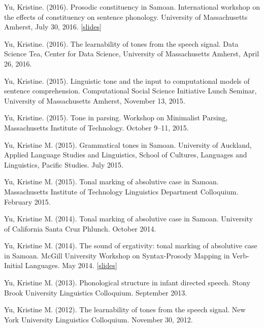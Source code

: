 \documentclass[10pt]{article}
\begin{document}
\begin{bibenum}
  \item Yu, Kristine. (2016). Prosodic constituency in Samoan. International workshop on the effects of
    constituency on sentence phonology. University of Massachusetts
    Amherst, July 30, 2016. [\href{https://speakerdeck.com/krisyu/prosodic-constituency-in-samoan}{slides}]

  \item Yu, Kristine. (2016). The learnability of tones from the
    speech signal. Data Science Tea, Center for Data
    Science, University of Massachusetts Amherst, April 26, 2016.

  \item Yu, Kristine. (2015). Linguistic tone and the input to
    computational models of sentence comprehension. Computational
    Social Science Initiative Lunch Seminar, University of
    Massachusetts Amherst, November 13, 2015.

  \item Yu, Kristine. (2015). Tone in parsing. Workshop on Minimalist
    Parsing, Massachusetts Institute of Technology. October 9--11, 2015.

    \item Yu, Kristine M. (2015). Grammatical tones in
      Samoan. University of Auckland, Applied Language Studies and Linguistics, School of Cultures, Languages and Linguistics, Pacific Studies. July 2015.

    \item Yu, Kristine M. (2015). Tonal marking of absolutive case in Samoan. Massachusetts Institute of
      Technology Linguistics Department Colloquium. February 2015.

    \item Yu, Kristine M. (2014). Tonal marking of absolutive case in
      Samoan. University of California Santa Cruz Phlunch. October 2014.

    \item Yu, Kristine M. (2014). The sound of ergativity: tonal
      marking of absolutive case in Samoan. McGill University Workshop
      on Syntax-Prosody Mapping in Verb-Initial Languages. May 2014. [\href{https://speakerdeck.com/krisyu/tonal-marking-of-absolutive-case-in-samoan}{slides}]

    \item Yu, Kristine M. (2013). Phonological structure in infant
      directed speech. Stony Brook University Linguistics Colloquium. September 2013.

    \item Yu, Kristine M. (2012). The learnability of tones from the
      speech signal. New York University Linguistics Colloquium. November 30, 2012.


\end{bibenum}
\end{document}
